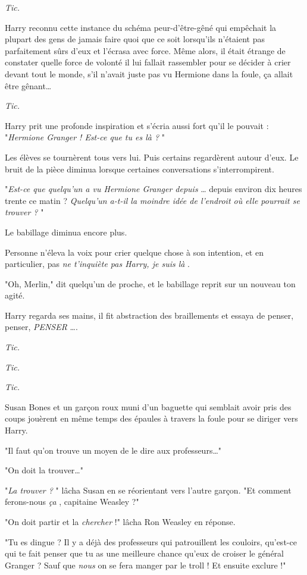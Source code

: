 \emph{Tic.} 

Harry reconnu cette instance du schéma peur-d'être-gêné qui empêchait la plupart des gens de jamais faire quoi que ce soit lorsqu'ils n'étaient pas parfaitement sûrs d'eux et l'écrasa avec force. Même alors, il était étrange de constater quelle force de volonté il lui fallait rassembler pour se décider à crier devant tout le monde, s'il n'avait juste pas vu Hermione dans la foule, ça allait être gênant…

\emph{Tic.} 

Harry prit une profonde inspiration et s'écria aussi fort qu'il le pouvait : "\emph{Hermione Granger ! Est-ce que tu es là ?} "

Les élèves se tournèrent tous vers lui. Puis certains regardèrent autour d'eux. Le bruit de la pièce diminua lorsque certaines conversations s'interrompirent.

"\emph{Est-ce que quelqu'un a vu Hermione Granger depuis} … depuis environ dix heures trente ce matin ? \emph{Quelqu'un a-t-il la moindre idée de l'endroit où elle pourrait se trouver ?} "

Le babillage diminua encore plus.

Personne n'éleva la voix pour crier quelque chose à son intention, et en particulier, pas \emph{ne t'inquiète pas Harry, je suis là} .

"Oh, Merlin," dit quelqu'un de proche, et le babillage reprit sur un nouveau ton agité.

Harry regarda ses mains, il fit abstraction des braillements et essaya de penser, penser, \emph{PENSER} ….

\emph{Tic.} 

\emph{Tic.} 

\emph{Tic.} 

Susan Bones et un garçon roux muni d'un baguette qui semblait avoir pris des coups jouèrent en même temps des épaules à travers la foule pour se diriger vers Harry.

"Il faut qu'on trouve un moyen de le dire aux professeurs…"

"On doit la trouver…"

"\emph{La trouver ?} " lâcha Susan en se réorientant vers l'autre garçon. "Et comment ferons-nous \emph{ça} , capitaine Weasley ?"

"On doit partir et la \emph{chercher}  !" lâcha Ron Weasley en réponse.

"Tu es dingue ? Il y a déjà des professeurs qui patrouillent les couloirs, qu'est-ce qui te fait penser que tu as une meilleure chance qu'eux de croiser le général Granger ? Sauf que \emph{nous}  on se fera manger par le troll ! Et ensuite exclure !"

